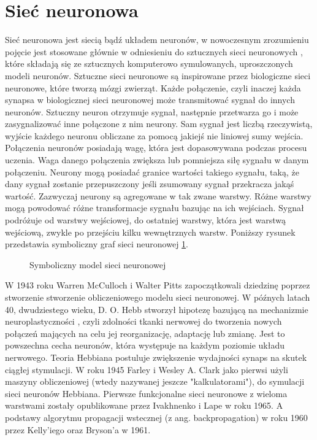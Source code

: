 \section{Sieć neuronowa}

Sieć neuronowa \cite{NeuralNetwork} \cite{ArtificialNeuralNetwork} \cite{DeepLearningFromScratch} \cite{HandsOnMachineLearning} jest siecią bądź układem neuronów, w nowoczesnym zrozumieniu pojęcie jest stosowane głównie w odniesieniu do sztucznych sieci neuronowych , które składają się ze sztucznych komputerowo symulowanych, uproszczonych modeli neuronów. Sztuczne sieci neuronowe są inspirowane przez biologiczne sieci neuronowe, które tworzą mózgi zwierząt.
Każde połączenie, czyli inaczej każda synapsa w biologicznej sieci neuronowej może transmitować sygnał do innych neuronów. Sztuczny neuron otrzymuje sygnał, następnie przetwarza go i może zasygnalizować inne połączone z nim neurony. Sam sygnał jest liczbą rzeczywistą, wyjście każdego neuronu obliczane za pomocą jakiejś nie liniowej sumy wejścia. Połączenia neuronów posiadają wagę, która jest dopasowywana podczas procesu uczenia. Waga danego połączenia zwiększa lub pomniejsza siłę sygnału w danym połączeniu. Neurony mogą posiadać granice wartości takiego sygnału, taką, że dany sygnał zostanie przepuszczony jeśli zsumowany sygnał przekracza jakąś wartość. Zazwyczaj neurony są agregowane w tak zwane warstwy. Różne warstwy mogą powodować różne transformacje sygnału bazując na ich wejściach. Sygnał podróżuje od warstwy wejściowej, do ostatniej warstwy, która jest warstwą wejściową, zwykle po przejściu kilku wewnętrznych warstw. Poniższy rysunek przedstawia symboliczny graf sieci neuronowej \ref{img:nn_symbolic_diagram}.


\begin{figure}[h]
    \centering
    \caption{Symboliczny model sieci neuronowej \cite{ColoredNeuralNetwork}}
    \label{img:nn_symbolic_diagram}
\end{figure}


\clearpage


W 1943 roku Warren McCulloch i Walter Pitts zapoczątkowali dziedzinę poprzez stworzenie stworzenie obliczeniowego modelu sieci neuronowej. W późnych latach 40, dwudziestego wieku, D. O. Hebb stworzył hipotezę bazującą na mechanizmie neuroplastyczności \cite{Neuroplastycznosc}, czyli zdolności tkanki nerwowej do tworzenia nowych połączeń mających na celu jej reorganizację, adaptację lub zmianę. Jest to powszechna cecha neuronów, która występuje na każdym poziomie układu nerwowego. Teoria Hebbiana postuluje zwiększenie wydajności synaps na skutek ciągłej stymulacji. W roku 1945 Farley i Wesley A. Clark jako pierwsi użyli maszyny obliczeniowej (wtedy nazywanej jeszcze "kalkulatorami"), do symulacji sieci neuronów Hebbiana. Pierwsze funkcjonalne sieci neuronowe z wieloma warstwami zostały opublikowane przez Ivakhnenko i Lape w roku 1965. A podstawy algorytmu propagacji wstecznej (z ang. backpropagation) w roku 1960 przez Kelly'iego oraz Bryson'a w 1961.

